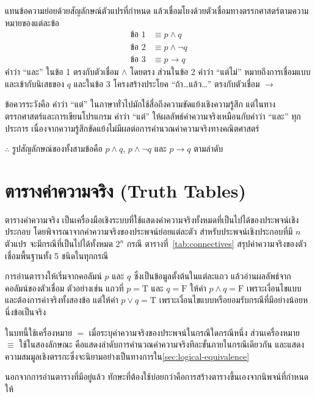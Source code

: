 \begin{solution}
แทนข้อความย่อยด้วยสัญลักษณ์ตัวแปรที่กำหนด แล้วเชื่อมโยงด้วยตัวเชื่อมทางตรรกศาสตร์ตามความหมายของแต่ละข้อ
\begin{align*}
\text{ข้อ 1} &\equiv p \land q\\
\text{ข้อ 2} &\equiv p \land \neg q\\
\text{ข้อ 3} &\equiv p \rightarrow q
\end{align*}
คำว่า ``และ'' ในข้อ 1 ตรงกับตัวเชื่อม $\land$ โดยตรง ส่วนในข้อ 2 คำว่า ``แต่ไม่'' หมายถึงการเชื่อมแบบและเข้ากับนิเสธของ $q$ และในข้อ 3 โครงสร้างประโยค ``ถ้า\ldots แล้ว\ldots'' ตรงกับตัวเชื่อม $\rightarrow$ 

ข้อควรระวังคือ คำว่า ``แต่'' ในภาษาทั่วไปมักใช้สื่อถึงความขัดแย้งเชิงความรู้สึก แต่ในทางตรรกศาสตร์และการเขียนโปรแกรม คำว่า ``แต่'' ให้ผลลัพธ์ค่าความจริงเหมือนกับคำว่า ``และ'' ทุกประการ เนื่องจากความรู้สึกขัดแย้งไม่มีผลต่อการคำนวณค่าความจริงทางคณิตศาสตร์

$\therefore$ รูปสัญลักษณ์ของทั้งสามข้อคือ $p \land q$, $p \land \neg q$ และ $p \rightarrow q$ ตามลำดับ \solhere
\end{solution}

\section{ตารางค่าความจริง (Truth Tables)}
\label{sec:truth-tables}

ตารางค่าความจริง เป็นเครื่องมือเชิงระบบที่ใช้แสดงค่าความจริงทั้งหมดที่เป็นไปได้ของประพจน์เชิงประกอบ โดยพิจารณาจากค่าความจริงของประพจน์ย่อยแต่ละตัว สำหรับประพจน์เชิงประกอบที่มี $n$ ตัวแปร จะมีกรณีที่เป็นไปได้ทั้งหมด $2^n$ กรณี ตารางที่~\ref{tab:connectives} สรุปค่าความจริงของตัวเชื่อมพื้นฐานทั้ง 5 ชนิดในทุกกรณี~\parencite{velleman2019prove}

การอ่านตารางให้เริ่มจากคอลัมน์ $p$ และ $q$ ซึ่งเป็นข้อมูลตั้งต้นในแต่ละแถว แล้วอ่านผลลัพธ์จากคอลัมน์ของตัวเชื่อม ตัวอย่างเช่น แถวที่ $p=\text{T}$ และ $q=\text{F}$ ให้ค่า $p\land q=\text{F}$ เพราะเงื่อนไขแบบและต้องการค่าจริงทั้งสองข้อ แต่ให้ค่า $p\lor q=\text{T}$ เพราะเงื่อนไขแบบหรือยอมรับกรณีที่มีอย่างน้อยหนึ่งข้อเป็นจริง

ในบทนี้ใช้เครื่องหมาย $=$ เมื่อระบุค่าความจริงของประพจน์ในกรณีใดกรณีหนึ่ง ส่วนเครื่องหมาย $\equiv$ ใช้ในสองลักษณะ คือแสดงลำดับการคำนวณค่าความจริงทีละขั้นภายในกรณีเดียวกัน และแสดงความสมมูลเชิงตรรกะซึ่งจะนิยามอย่างเป็นทางการใน\autoref{sec:logical-equivalence}

นอกจากการอ่านตารางที่มีอยู่แล้ว ทักษะที่ต้องใช้บ่อยกว่าคือการสร้างตารางขึ้นเองจากนิพจน์ที่กำหนดให้

